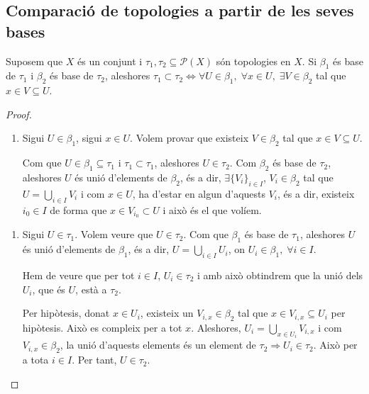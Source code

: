 \documentclass[../main.tex]{subfiles}
\begin{document}
\subsection{Comparació de topologies a partir de les seves bases}
\begin{lema}
\label{lema:dosbases} Suposem que $X$ és un conjunt i $\tau_1,\tau_2\subseteq\mathscr{P}(X)$ són topologies en $X$. Si $\beta_1$ és base de $\tau_1$ i $\beta_2$ és base de $\tau_2$, aleshores $\tau_1\subset \tau_2\Leftrightarrow \forall U\in\beta_1,\;\forall x\in U,\;\exists V\in\beta_2$ tal que $x\in V\subseteq U$.
\end{lema}
\begin{proof}
\begin{enumerate}[($\Rightarrow$)]
    \item Sigui $U\in\beta_1$, sigui $x\in U$. Volem provar que existeix $V\in\beta_2$ tal que $x\in V\subseteq U$.
    
    Com que $U\in\beta_1\subseteq\tau_1$ i $\tau_1\subset \tau_1$, aleshores $U\in\tau_2$. Com $\beta_2$ és base de $\tau_2$, aleshores $U$ és unió d'elements de $\beta_2$, és a dir, $\exists \{V_i\}_{i\in I}$, $V_i\in \beta_2$ tal que $U=\bigcup_{i\in I} V_i$ i com $x\in U$, ha d'estar en algun d'aquests $V_i$, és a dir, existeix $i_0\in I$ de forma que $x\in V_{i_0}\subset U$ i això és el que volíem.
\end{enumerate}
\begin{enumerate}[($\Leftarrow$)]
    \item Sigui $U\in\tau_1$. Volem veure que $U\in \tau_2$. Com que $\beta_1$ és base de $\tau_1$, aleshores $U$ és unió d'elements de $\beta_1$, és a dir, $U=\bigcup_{i\in I}U_i$, on $U_i\in \beta_1,\;\forall i\in I$. 
    
    Hem de veure que per tot $i\in I$, $U_i\in \tau_2$ i amb això obtindrem que la unió dels $U_i$, que és $U$, està a $\tau_2$.
    
    Per hipòtesis, donat $x\in U_i$, existeix un $V_{i,x}\in \beta_2$ tal que $x\in V_{i,x}\subseteq U_i$ per hipòtesis. Això es compleix per a tot $x$. Aleshores, $U_i = \bigcup_{x\in U_i} V_{i,x}$ i com $V_{i,x}\in \beta_2$, la unió d'aquests elements és un element de $\tau_2\Rightarrow U_i\in \tau_2$. Això per a tota $i\in I$. Per tant, $U\in\tau_2$.
\end{enumerate}
\end{proof}
\end{document}
